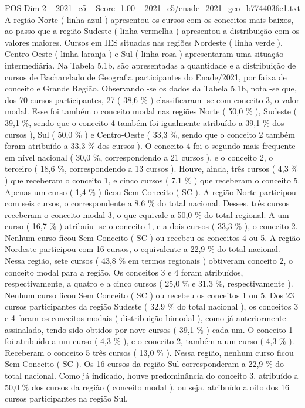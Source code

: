 \begin{textsample}{POS Dim 2 – 2021\_c5 – Score -1.00 – 2021\_c5/enade\_2021\_geo\_b7744036e1.txt}
A região Norte ( linha azul ) apresentou os cursos com os conceitos mais baixos, ao passo que a região Sudeste ( linha vermelha ) apresentou a distribuição com os valores maiores.
Cursos em IES situadas nas regiões Nordeste ( linha verde ), Centro-Oeste ( linha laranja ) e Sul ( linha rosa ) apresentaram uma situação intermediária.
Na Tabela 5.1b, são apresentadas a quantidade e a distribuição de cursos de Bacharelado de Geografia participantes do Enade/2021, por faixa de conceito e Grande Região.
Observando -se os dados da Tabela 5.1b, nota -se que, dos 70 cursos participantes, 27 ( 38,6 \% ) classificaram -se com conceito 3, o valor modal.
Esse foi também o conceito modal nas regiões Norte ( 50,0 \% ), Sudeste ( 39,1 \%, sendo que o conceito 4 também foi igualmente atribuído a 39,1 \% dos cursos ), Sul ( 50,0 \% ) e Centro-Oeste ( 33,3 \%, sendo que o conceito 2 também foram atribuído a 33,3 \% dos cursos ).
O conceito 4 foi o segundo mais frequente em nível nacional ( 30,0 \%, correspondendo a 21 cursos ), e o conceito 2, o terceiro ( 18,6 \%, correspondendo a 13 cursos ).
Houve, ainda, três cursos ( 4,3 \% ) que receberam o conceito 1, e cinco cursos ( 7,1 \% ) que receberam o conceito 5.
Apenas um curso ( 1,4 \% ) ficou Sem Conceito ( SC ).
A região Norte participou com seis cursos, o correspondente a 8,6 \% do total nacional.
Desses, três cursos receberam o conceito modal 3, o que equivale a 50,0 \% do total regional.
A um curso ( 16,7 \% ) atribuiu -se o conceito 1, e a dois cursos ( 33,3 \% ), o conceito 2.
Nenhum curso ficou Sem Conceito ( SC ) ou recebeu os conceitos 4 ou 5.
A região Nordeste participou com 16 cursos, o equivalente a 22,9 \% do total nacional.
Nessa região, sete cursos ( 43,8 \% em termos regionais ) obtiveram conceito 2, o conceito modal para a região.
Os conceitos 3 e 4 foram atribuídos, respectivamente, a quatro e a cinco cursos ( 25,0 \% e 31,3 \%, respectivamente ).
Nenhum curso ficou Sem Conceito ( SC ) ou recebeu os conceitos 1 ou 5.
Dos 23 cursos participantes da região Sudeste ( 32,9 \% do total nacional ), os conceitos 3 e 4 foram os conceitos modais ( distribuição bimodal ), como já anteriormente assinalado, tendo sido obtidos por nove cursos ( 39,1 \% ) cada um.
O conceito 1 foi atribuído a um curso ( 4,3 \% ), e o conceito 2, também a um curso ( 4,3 \% ).
Receberam o conceito 5 três cursos ( 13,0 \% ).
Nessa região, nenhum curso ficou Sem Conceito ( SC ).
Os 16 cursos da região Sul corresponderam a 22,9 \% do total nacional.
Como já indicado, houve predominância do conceito 3, atribuído a 50,0 \% dos cursos da região ( conceito modal ), ou seja, atribuído a oito dos 16 cursos participantes na região Sul.

\end{textsample}
